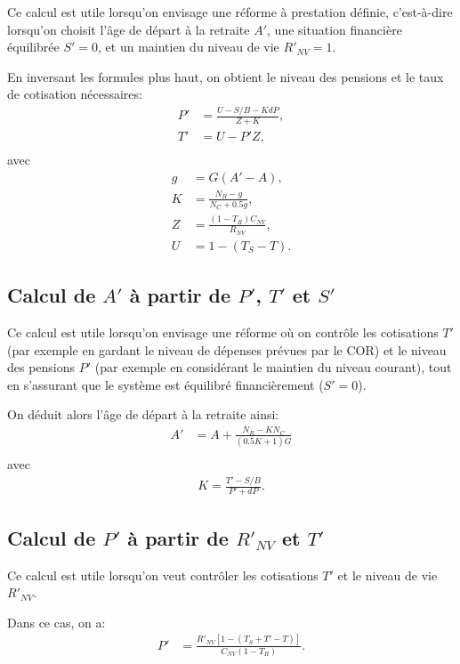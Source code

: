 \documentclass[10pt]{article}
\begin{document}
  Ce calcul est utile lorsqu'on envisage une réforme à prestation définie, c'est-à-dire lorsqu'on choisit l'âge de départ à la retraite $A'$, une situation financière équilibrée $S'=0$, et un maintien du niveau de vie $R'_{NV}=1$.

  En inversant les formules plus haut, on obtient le niveau des pensions et le taux de cotisation nécessaires:
  \begin{align}
    P' &= \frac{U-S/B-KdP}{Z+K}, \\
    T' & = U-P'Z, \\
  \end{align}
  avec
  \begin{align}
    g & = G (A'-A), \\
    K & = \frac{N_R-g}{N_C + 0.5g}, \\
    Z & = \frac{ (1-T_R) C_{NV} }{R_{NV}}, \\
    U & = 1 - (T_S - T).
  \end{align}


\subsection{Calcul de $A'$ à partir de $P'$, $T'$ et $S'$}

  Ce calcul est utile lorsqu'on envisage une réforme où on contrôle les cotisations $T'$ (par exemple en gardant le niveau de dépenses prévues par le COR) et le niveau des pensions $P'$ (par exemple en considérant le maintien du niveau courant), tout en s'assurant que le système est équilibré financièrement ($S'=0$).

On déduit alors l'âge de départ à la retraite ainsi:
\begin{align}
     A' & = A + \frac{N_R - K N_C}{(0.5K+1)G}  \\
  \end{align}
  avec
  \begin{align}
    K = \frac{T'-S/B}{P'+dP}.
  \end{align}

  
  
  \subsection{Calcul de $P'$ à partir de $R'_{NV}$ et $T'$}

  Ce calcul est utile lorsqu'on veut contrôler les cotisations $T'$ et le niveau de vie $R'_{NV}$.

  Dans ce cas, on a:
  \begin{align}
    P' &= \frac{R'_{NV}[1-(T_S+T'-T)]}{C_{NV}(1-T_R)}. \\
  \end{align}
\end{document}
